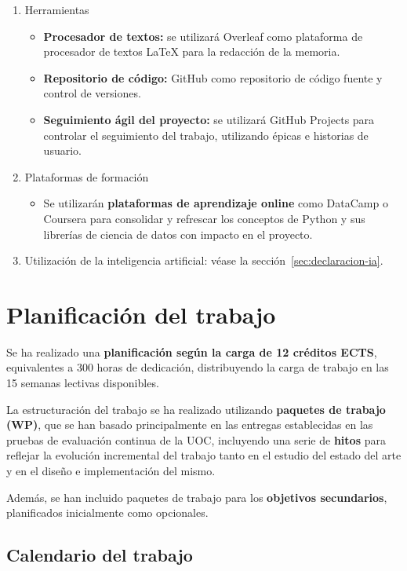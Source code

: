 \begin{enumerate}
\begin{itemize}
        \end{itemize}
    \item Herramientas
        \begin{itemize}
            \item \textbf{Procesador de textos:} se utilizará Overleaf como plataforma de procesador de textos LaTeX para la redacción de la memoria.
            \item \textbf{Repositorio de código:} GitHub como repositorio de código fuente y control de versiones.
            \item \textbf{Seguimiento ágil del proyecto:} se utilizará GitHub Projects para controlar el seguimiento del trabajo, utilizando épicas e historias de usuario.
        \end{itemize}
    \item Plataformas de formación
        \begin{itemize}
            \item Se utilizarán \textbf{plataformas de aprendizaje online} como DataCamp o Coursera para consolidar y refrescar los conceptos de Python y sus librerías de ciencia de datos con impacto en el proyecto.
        \end{itemize}    
    \item Utilización de la inteligencia artificial: véase la sección~\ref{sec:declaracion-ia}.
\end{enumerate}


\section{Planificación del trabajo}

Se ha realizado una \textbf{planificación según la carga de 12 créditos ECTS}, equivalentes a 300 horas de dedicación, distribuyendo la carga de trabajo en las 15 semanas lectivas disponibles.

La estructuración del trabajo se ha realizado utilizando \textbf{paquetes de trabajo (WP)}, que se han basado principalmente en las entregas establecidas en las pruebas de evaluación continua de la UOC, incluyendo una serie de \textbf{hitos} para reflejar la evolución incremental del trabajo tanto en el estudio del estado del arte y en el diseño e implementación del mismo.

Además, se han incluido paquetes de trabajo para los \textbf{objetivos secundarios}, planificados inicialmente como opcionales.

\subsection{Calendario del trabajo}

